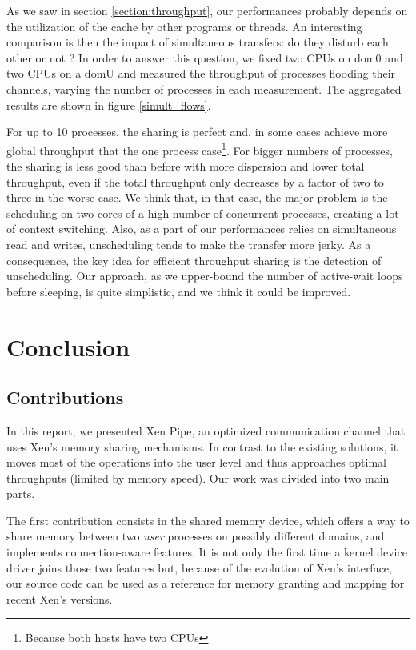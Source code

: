 \documentclass[journal]{IEEEtran}
\begin{document}
As we saw in section \ref{section:throughput}, our performances probably depends on the utilization of the cache by other programs or threads. An interesting comparison is then the impact of simultaneous transfers: do they disturb each other or not ? In order to answer this question, we fixed two CPUs on dom0 and two CPUs on a domU and measured the throughput of processes flooding their channels, varying the number of processes in each measurement. The aggregated results are shown in figure \ref{simult_flows}.



For up to 10 processes, the sharing is perfect and, in some cases achieve more global throughput that the one process case\footnote{Because both hosts have two CPUs}. For bigger numbers of processes, the sharing is less good than before with more dispersion and lower total throughput, even if the total throughput only decreases by a factor of two to three in the worse case. We think that, in that case, the major problem is the scheduling on two cores of a high number of concurrent processes, creating a lot of context switching. 
Also, as a part of our performances relies on simultaneous read and writes, unscheduling tends to make the transfer more jerky. As a consequence, the key idea for efficient throughput sharing is the detection of unscheduling. Our approach, as we upper-bound the number of active-wait loops before sleeping, is quite simplistic, and we think it could be improved.


\section{Conclusion}

\subsection{Contributions}

In this report, we presented Xen Pipe, an optimized communication channel that uses Xen's memory sharing mechanisms. In contrast to the existing solutions, it moves most of the operations into the user level and thus approaches optimal throughputs (limited by memory speed). Our work was divided into two main parts.

The first contribution consists in the shared memory device, which offers a way to share memory between two \emph{user} processes on possibly different domains, and implements connection-aware features. It is not only the first time a kernel device driver joins those two features but, because of the evolution of Xen's interface, our source code can be used as a reference for memory granting and mapping for recent Xen's versions.
\end{document}
